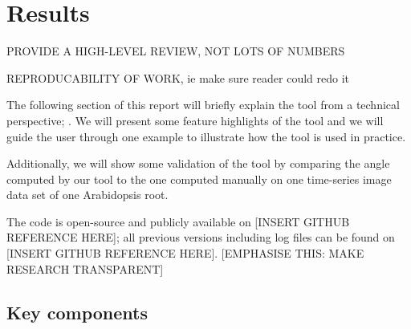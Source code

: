
\chapter{Results} %

\label{results} %

%


PROVIDE A HIGH-LEVEL REVIEW, NOT LOTS OF NUMBERS

REPRODUCABILITY OF WORK, ie make sure reader could redo it


The following section of this report will briefly explain the tool from a technical perspective; .  %
We will present some feature highlights of the tool and we will guide the user through one example to illustrate how the tool is used in practice.

Additionally, we will show some validation of the tool by comparing the angle computed by our tool to the one computed manually on one time-series image data set of one Arabidopsis root. 

The code is open-source and publicly available on [INSERT GITHUB REFERENCE HERE]; all previous versions including log files can be found on [INSERT GITHUB REFERENCE HERE].
[EMPHASISE THIS: MAKE RESEARCH TRANSPARENT]


\section{Key components}


